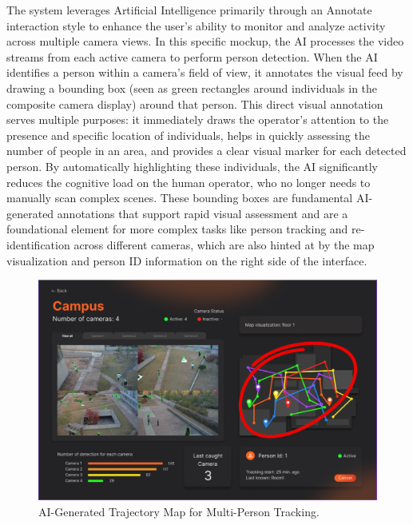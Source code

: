The system leverages Artificial Intelligence primarily through an Annotate interaction style to enhance the user's ability to monitor and analyze activity across multiple camera views. In this specific mockup, the AI processes the video streams from each active camera to perform person detection.
When the AI identifies a person within a camera's field of view, it annotates the visual feed by drawing a bounding box (seen as green rectangles around individuals in the composite camera display) around that person. This direct visual annotation serves multiple purposes: it immediately draws the operator's attention to the presence and specific location of individuals, helps in quickly assessing the number of people in an area, and provides a clear visual marker for each detected person. By automatically highlighting these individuals, the AI significantly reduces the cognitive load on the human operator, who no longer needs to manually scan complex scenes. These bounding boxes are fundamental AI-generated annotations that support rapid visual assessment and are a foundational element for more complex tasks like person tracking and re-identification across different cameras, which are also hinted at by the map visualization and person ID information on the right side of the interface.

\begin{figure}[!htb]
    \centering
    \includegraphics[width=1.0\textwidth,keepaspectratio]{assets/jubjones/ai_mockup_map.png}
    \caption{AI-Generated Trajectory Map for Multi-Person Tracking.}
    \label{fig:ai_mockup_map}
\end{figure}

